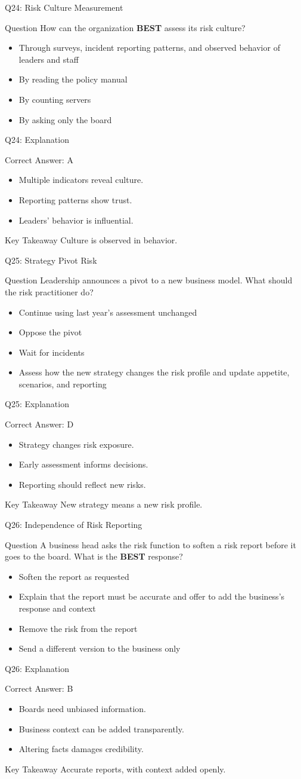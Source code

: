 \documentclass[aspectratio=169]{beamer}
\newcommand{\hq}[7]{%
	\begin{frame}{Q#1: #2}
		\begin{block}{Question}
			#3
		\end{block}
		\begin{itemize}
			#4
		\end{itemize}
	\end{frame}
	\begin{frame}{Q#1: Explanation}
		\begin{block}{Correct Answer: #5}
			\begin{itemize}
				#6
			\end{itemize}
		\end{block}
		\begin{alertblock}{Key Takeaway}
			#7
		\end{alertblock}
	\end{frame}
}
\begin{document}
	\hq{24}{Risk Culture Measurement}
	{How can the organization \textbf{BEST} assess its risk culture?}
	{\item[\textbf{(A)}] Through surveys, incident reporting patterns, and observed behavior of leaders and staff
		\item[\textbf{(B)}] By reading the policy manual
		\item[\textbf{(C)}] By counting servers
		\item[\textbf{(D)}] By asking only the board}
	{A}
	{\item Multiple indicators reveal culture.
		\item Reporting patterns show trust.
		\item Leaders' behavior is influential.}
	{Culture is observed in behavior.}
	
	\hq{25}{Strategy Pivot Risk}
	{Leadership announces a pivot to a new business model. What should the risk practitioner do?}
	{\item[\textbf{(A)}] Continue using last year's assessment unchanged
		\item[\textbf{(B)}] Oppose the pivot
		\item[\textbf{(C)}] Wait for incidents
		\item[\textbf{(D)}] Assess how the new strategy changes the risk profile and update appetite, scenarios, and reporting}
	{D}
	{\item Strategy changes risk exposure.
		\item Early assessment informs decisions.
		\item Reporting should reflect new risks.}
	{New strategy means a new risk profile.}
	
	\hq{26}{Independence of Risk Reporting}
	{A business head asks the risk function to soften a risk report before it goes to the board. What is the \textbf{BEST} response?}
	{\item[\textbf{(A)}] Soften the report as requested
		\item[\textbf{(B)}] Explain that the report must be accurate and offer to add the business's response and context
		\item[\textbf{(C)}] Remove the risk from the report
		\item[\textbf{(D)}] Send a different version to the business only}
	{B}
	{\item Boards need unbiased information.
		\item Business context can be added transparently.
		\item Altering facts damages credibility.}
	{Accurate reports, with context added openly.}
	
\end{document}
